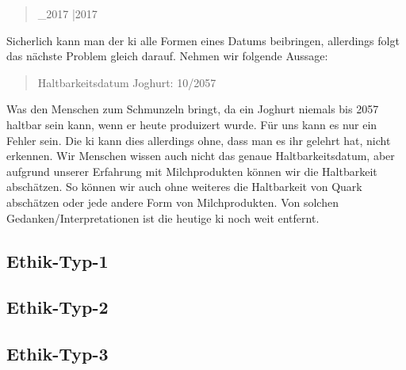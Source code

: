 \begin{quote}
		\_2017	 |2017  
\end{quote}
Sicherlich kann man der \ac{ki} alle Formen eines Datums beibringen, allerdings folgt das nächste Problem gleich darauf. Nehmen wir folgende Aussage:
\begin{quote}
	\quad Haltbarkeitsdatum Joghurt: 10/2057 
\end{quote}
Was den Menschen zum Schmunzeln bringt, da ein Joghurt niemals bis 2057 haltbar sein kann, wenn er heute produizert wurde. Für uns kann es nur ein Fehler sein. Die \ac{ki} kann dies allerdings ohne, dass man es ihr gelehrt hat, nicht erkennen. Wir Menschen wissen auch nicht das genaue Haltbarkeitsdatum, aber aufgrund unserer Erfahrung mit Milchprodukten können wir die Haltbarkeit abschätzen. So können wir auch ohne weiteres die Haltbarkeit von Quark abschätzen oder jede andere Form von Milchprodukten. Von solchen Gedanken/Interpretationen ist die heutige \ac{ki} noch weit entfernt. 

\subsection{Ethik-Typ-1}

\subsection{Ethik-Typ-2}

\subsection{Ethik-Typ-3}
